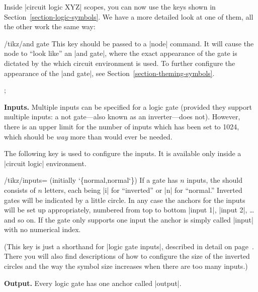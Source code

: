 Inside |circuit logic XYZ| scopes, you can now use the keys shown in
Section~\ref{section-logic-symbols}. We have a more detailed look at
one of them, all the other work the same way:

\begin{key}{/tikz/and gate}
  This key should be passed to a |node| command. It will cause the
  node to ``look like'' an |and gate|, where the exact appearance of the
  gate is dictated by the which circuit environment is used.   To
  further configure the appearance of the |and gate|, see
  Section~\ref{section-theming-symbols}.

\begin{codeexample}[]
 ;
\end{codeexample}
\begin{codeexample}[]
\end{codeexample}

  \medskip\textbf{Inputs.}
  Multiple inputs can be specified for a logic gate (provided they
  support multiple inputs: a not gate---also known as an
  inverter---does not). However, there is an upper limit for the
  number of inputs which has been set to 1024, which should be \emph{way}
  more than would ever be needed.

  The following key is used to configure the inputs. It is available
  only inside a |circuit logic| environment.

  \begin{key}{/tikz/inputs= (initially \char`\{normal,normal\char`\})}
    If a gate has $n$ inputs, the  should consists of
    $n$ letters, each being |i| for ``inverted'' or |n| for
    ``normal.'' Inverted gates will be indicated by a little
    circle. In any case the anchors for the inputs will be set
    up appropriately, numbered from top to bottom |input 1|, |input 2|,
    \ldots and so on. If the gate only supports one input the anchor
    is simply called |input| with no numerical index.
\begin{codeexample}[]
\end{codeexample}
  \end{key}

  (This key is just a shorthand for |logic gate inputs|, described
  in detail on page~\pageref{logic-gate-inputs}. There you will also
  find descriptions of how to configure the size of the inverted
  circles and the way the symbol size increases when there are too
  many inputs.)

  \textbf{Output.}
  Every logic gate has one anchor called |output|.
\end{key}


